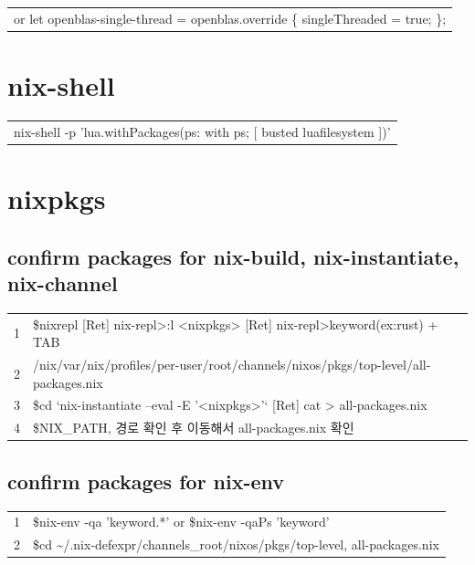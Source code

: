 \documentclass[11pt]{article}
\begin{document}
\begin{center}
\begin{tabular}{l}
or let openblas-single-thread = openblas.override \{ singleThreaded = true; \};\\
\end{tabular}
\end{center}
\section{nix-shell}
\label{sec:org695e7fe}
\begin{center}
\begin{tabular}{l}
nix-shell -p 'lua.withPackages(ps: with ps; [ busted luafilesystem ])'\\
\end{tabular}
\end{center}

\section{nixpkgs}
\label{sec:org30b820f}
\subsection{confirm packages for nix-build, nix-instantiate, nix-channel}
\label{sec:org81bf805}
\begin{center}
\begin{tabular}{rl}
1 & \$nixrepl [Ret] nix-repl>:l <nixpkgs> [Ret] nix-repl>keyword(ex:rust) + TAB\\
2 & /nix/var/nix/profiles/per-user/root/channels/nixos/pkgs/top-level/all-packages.nix\\
3 & \$cd `nix-instantiate --eval -E '<nixpkgs>'` [Ret] cat > all-packages.nix\\
4 & \$NIX\_PATH, 경로 확인 후 이동해서 all-packages.nix 확인\\
\end{tabular}
\end{center}

\subsection{confirm packages for nix-env}
\label{sec:orgaf92d13}
\begin{center}
\begin{tabular}{rl}
1 & \$nix-env -qa 'keyword.*' or \$nix-env -qaPs 'keyword'\\
2 & \$cd \textasciitilde{}/.nix-defexpr/channels\_root/nixos/pkgs/top-level, all-packages.nix\\
\end{tabular}
\end{center}
\end{document}
